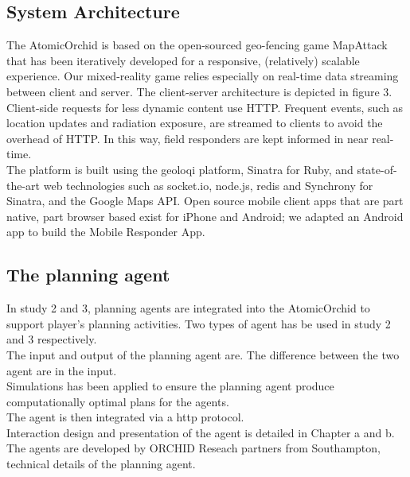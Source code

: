 \subsection{System Architecture}
The AtomicOrchid is based on the open-sourced geo-fencing game MapAttack that has been iteratively developed for a responsive, (relatively) scalable experience. Our mixed-reality game relies especially on real-time data streaming between client and server. The client-server architecture is depicted in figure 3. Client-side requests for less dynamic content use HTTP. Frequent events, such as location updates and radiation exposure, are streamed to clients to avoid the overhead of HTTP. In this way, field responders are kept informed in near real-time.\\

The platform is built using the geoloqi platform, Sinatra for Ruby, and state-of-the-art web technologies such as socket.io, node.js, redis and Synchrony for Sinatra, and the Google Maps API. Open source mobile client apps that are part native, part browser based exist for iPhone and Android; we adapted an Android app to build the Mobile Responder App.\\


\subsection{The planning agent}

In study 2 and 3, planning agents are integrated into the AtomicOrchid to support player's planning activities. Two types of agent has be used in study 2 and 3 respectively. \\

The input and output of the planning agent are. The difference between the two agent are in the input. \\

Simulations has been applied to ensure the planning agent produce computationally optimal plans for the agents.\\

The agent is then integrated via a http protocol. \\

Interaction design and presentation of the agent is detailed in Chapter a and b.\\

The agents are developed by ORCHID Reseach partners from Southampton, technical details of the planning agent.\\





